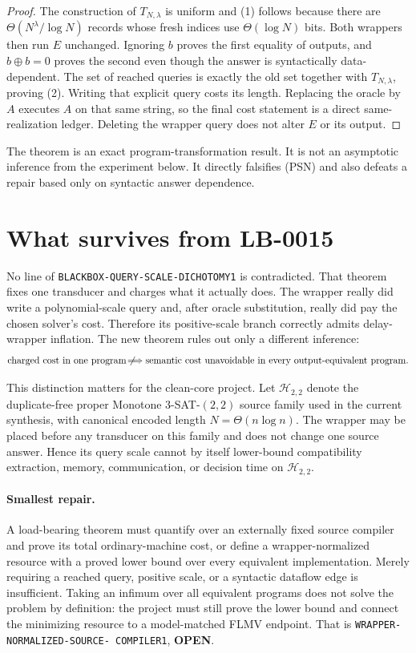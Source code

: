 \documentclass[11pt]{article}
\newcommand{\OPEN}{\textbf{OPEN}}
\begin{document}
\begin{proof}
The construction of $T_{N,\lambda}$ is uniform and (1) follows because there
are $\Theta(N^\lambda/\log N)$ records whose fresh indices use
$\Theta(\log N)$ bits.  Both wrappers then run $E$ unchanged.  Ignoring $b$
proves the first equality of outputs, and $b\oplus b=0$ proves the second
even though the answer is syntactically data-dependent.  The set of reached
queries is exactly the old set together with $T_{N,\lambda}$, proving (2).
Writing that explicit query costs its length.  Replacing the oracle by $A$
executes $A$ on that same string, so the final cost statement is a direct
same-realization ledger.  Deleting the wrapper query does not alter $E$ or
its output. \qedhere
\end{proof}

The theorem is an exact program-transformation result.  It is not an
asymptotic inference from the experiment below.  It directly falsifies (PSN)
and also defeats a repair based only on syntactic answer dependence.

\section{What survives from LB-0015}

No line of \texttt{BLACKBOX-QUERY-SCALE-DICHOTOMY1} is contradicted.  That
theorem fixes one transducer and charges what it actually does.  The wrapper
really did write a polynomial-scale query and, after oracle substitution,
really did pay the chosen solver's cost.  Therefore its positive-scale branch
correctly admits delay-wrapper inflation.  The new theorem rules out only a
different inference:
\[
 \text{charged cost in one program}
 \not\!\Longrightarrow
 \text{semantic cost unavoidable in every output-equivalent program}.
\]

This distinction matters for the clean-core project.  Let
$\mathcal H_{2,2}$ denote the duplicate-free proper Monotone
3-SAT-$(2,2)$ source family used in the current synthesis, with canonical
encoded length $N=\Theta(n\log n)$.  The wrapper may be placed before any
transducer on this family and does not change one source answer.  Hence its
query scale cannot by itself lower-bound compatibility extraction, memory,
communication, or decision time on $\mathcal H_{2,2}$.

\paragraph{Smallest repair.}
A load-bearing theorem must quantify over an externally fixed source
compiler and prove its total ordinary-machine cost, or define a
wrapper-normalized resource with a proved lower bound over every equivalent
implementation.  Merely requiring a reached query, positive scale, or a
syntactic dataflow edge is insufficient.  Taking an infimum over all
equivalent programs does not solve the problem by definition: the project
must still prove the lower bound and connect the minimizing resource to a
model-matched FLMV endpoint.  That is \texttt{WRAPPER-NORMALIZED-SOURCE-
COMPILER1}, \OPEN.
\end{document}

